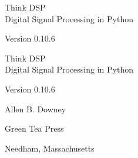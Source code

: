 \documentclass[12pt]{book}
\newcommand{\theversion}{0.10.6}
\begin{document}
\begin{latexonly}

\renewcommand{\topfraction}{0.9}
\renewcommand{\blankpage}{\thispagestyle{empty} \quad \newpage}


\thispagestyle{empty}

\begin{flushright}
\vspace*{2.0in}

\begin{spacing}{3}
{\huge Think DSP}\\
{\Large Digital Signal Processing in Python}
\end{spacing}

\vspace{0.25in}

Version \theversion

\vfill

\end{flushright}


\blankpage
\blankpage

\pagebreak
\thispagestyle{empty}

\begin{flushright}
\vspace*{2.0in}

\begin{spacing}{3}
{\huge Think DSP}\\
{\Large Digital Signal Processing in Python}
\end{spacing}

\vspace{0.25in}

Version \theversion

\vspace{1in}


{\Large
Allen B. Downey\\
}


\vspace{0.5in}

{\Large Green Tea Press}

{\small Needham, Massachusetts}

\vfill

\end{flushright}



\end{latexonly}
\end{document}
